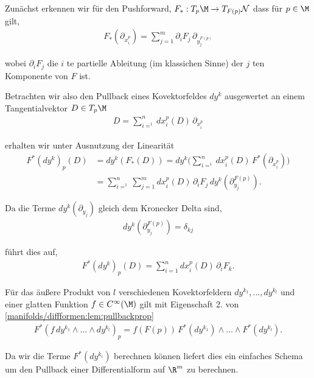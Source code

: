 \documentclass[letterpaper,10pt,german]{jupyterBook}
\begin{document}
\par
Zunächst erkennen wir für den Pushforward, \(F_\ast:T_p\M\to T_{F(p)}\mathcal{N}\) dass für \(p\in\M\) gilt,
\begin{align*}
F_\ast(\partial_{x_i^p}) = \sum_{j=1}^m \partial_i F_j\, \partial_{y_j^{F(p)}}
\end{align*}
\par
wobei \(\partial_i F_j\) die \(i\) te partielle Ableitung (im klassichen Sinne) der \(j\) ten Komponente von \(F\) ist.

\par
Betrachten wir also den Pullback eines Kovektorfeldes \(dy^k\) ausgewertet an einem Tangentialvektor \(D\in T_p\M\)
\begin{align*}
D = \sum_{i=^1}^n dx_i^p(D)\, \partial_{x_i^p}
\end{align*}
\par
erhalten wir unter Ausnutzung der Linearität
\begin{align*}
F^\ast(dy^k)_{p}(D) &= dy^k(F_\ast(D)) = 
dy^k\big(\sum_{i=^1}^n dx_i^p(D)\, F^\ast(\partial_{x_i^p})\big)\\
&=
\sum_{i=^1}^n \sum_{j=1}^m dx_i^p(D)\,\partial_i F_j\, dy^k(\partial_{y_j}^{F(p)}).
\end{align*}
\par
Da die Terme \(dy^k(\partial_{y_j})\) gleich dem Kronecker Delta sind,
\begin{align*}
dy^k(\partial_{y_j}^{F(p)}) = \delta_{kj}
\end{align*}
\par
führt dies auf,
\begin{align*}
F^\ast(dy^k)_{p}(D) =
\sum_{i=1}^n dx_i^p(D)\,\partial_i F_k.
\end{align*}
\par
Für das äußere Produkt von \(l\) verschiedenen Kovektorfeldern \(dy^{k_1},\ldots, dy^{k_l}\) und einer glatten Funktion \(f\in C^\infty(\M)\) gilt mit Eigenschaft 2. von \cref{manifolds/diffformen:lem:pullbackprop} \begin{align*}
F^\ast(f\, dy^{k_1}\wedge\ldots\wedge dy^{k_l})_{p} =
f(F(p))\, F^\ast(dy^{k_1})\wedge\ldots\wedge F^\ast(dy^{k_l}).
\end{align*}
\par
Da wir die Terme \(F^\ast(dy^{k_i})\) berechnen können liefert dies ein einfaches Schema um den Pullback einer Differentialform auf \(\R^m\) zu berechnen.
\end{document}
